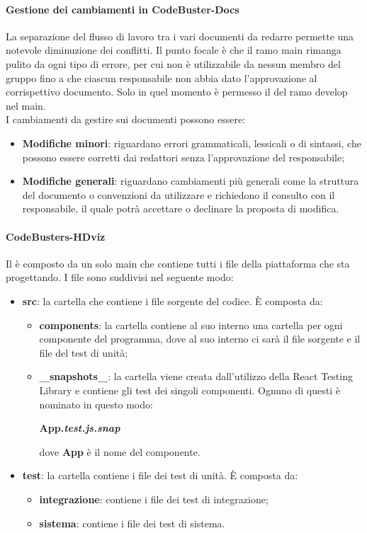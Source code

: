 \paragraph{Gestione dei cambiamenti in CodeBuster-Docs}
La separazione del flusso di lavoro tra i vari documenti da redarre permette una notevole diminuzione dei conflitti. Il punto focale è che il ramo main rimanga pulito da ogni tipo di errore, per cui non è utilizzabile da nessun membro del gruppo fino a che ciascun responsabile non abbia dato l'approvazione al corrispettivo documento. Solo in quel momento è permesso il  del ramo develop nel main. \\
I cambiamenti da gestire sui documenti possono essere:
\begin{itemize}
	\item \textbf{Modifiche minori}: riguardano errori grammaticali, lessicali o di sintassi, che possono essere corretti dai redattori senza l'approvazione del responsabile;
	\item \textbf{Modifiche generali}: riguardano cambiamenti più generali come la struttura del documento o convenzioni da utilizzare e richiedono il consulto con il responsabile, il quale potrà accettare o declinare la proposta di modifica.
\end{itemize}

\paragraph{CodeBusters-HDviz}
Il  è composto da un solo  main che contiene tutti i file della piattaforma che \Gruppo{} sta progettando. I file sono suddivisi nel seguente modo:
\begin{itemize}
	\item \textbf{src}: la cartella che contiene i file sorgente del codice. È composta da:
	\begin{itemize}
		\item \textbf{components}: la cartella contiene al suo interno una cartella per ogni componente del programma, dove al suo interno ci sarà il file sorgente e il file del test di unità;
		\item \texttt{\_\_}\textbf{snapshots}\texttt{\_\_}: la cartella viene creata dall'utilizzo della React Testing Library e contiene gli  test dei singoli componenti. Ognuno di questi è nominato in questo modo:
				\begin{center}
					\textbf{App.\textit{test.js.snap}}
				\end{center}
				dove \textbf{App} è il nome del componente.

	\end{itemize}
	\item \textbf{test}: la cartella contiene i file dei test di unità. È composta da:
	\begin{itemize}
		\item \textbf{integrazione}: contiene i file dei test di integrazione;
		\item \textbf{sistema}: contiene i file dei test di sistema.
	\end{itemize}
\end{itemize}

